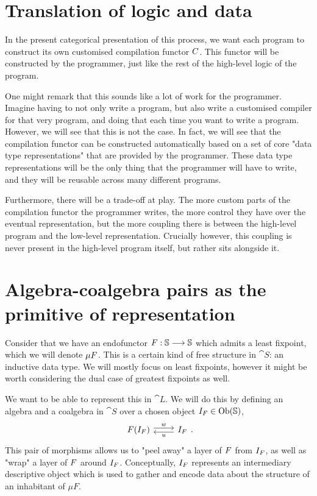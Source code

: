 \section{Translation of logic and data}

In the present categorical presentation of this process, we want each program
to construct its own customised compilation functor $ C$. This functor will
be constructed by the programmer, just like the rest of the high-level logic of
the program.

One might remark that this sounds like a lot of work for the programmer.
Imagine having to not only write a program, but also write a customised
compiler for that very program, and doing that each time you want to write a
program. However, we will see that this is not the case. In fact, we will see
that the compilation functor can be constructed automatically based on a set of
core "data type representations" that are provided by the programmer. These
data type representations will be the only thing that the programmer will have
to write, and they will be reusable across many different programs.

Furthermore, there will be a trade-off at play. The more custom parts of the
compilation functor the programmer writes, the more control they have over the
eventual representation, but the more coupling there is between the high-level
program and the low-level representation. Crucially however, this coupling is
never present in the high-level program itself, but rather sits alongside it.

\section{Algebra-coalgebra pairs as the primitive of representation}

Consider that we have an endofunctor $ F : \mathbb S \longrightarrow \mathbb S$ which
admits a least fixpoint, which we will denote $\mu  F$. This is a certain
kind of free structure in $\cat S$: an inductive data type. We will mostly
focus on least fixpoints, however it might be worth considering the dual case
of greatest fixpoints as well.

We want to be able to represent this in $\cat L$. We will do this by defining
an algebra and a coalgebra in $\cat S$ over a chosen object $I_{ F} \in
  \mathrm{Ob}(\mathbb S)$,
\begin{equation}
  \begin{tikzcd}
    F(I_{\fun F}) \arrow[r, "w", shift left] & I_{\fun F} \arrow[l, "u", shift left]
  \end{tikzcd}.
\end{equation}
This pair of morphisms allows us to "peel away" a layer of $ F$ from $I_{ F}$, as
well as "wrap" a layer of $ F$ around $I_{ F}$. Conceptually, $I_{ F}$ represents an
intermediary descriptive object which is used to gather and encode data about
the structure of an inhabitant of $\mu F$.

